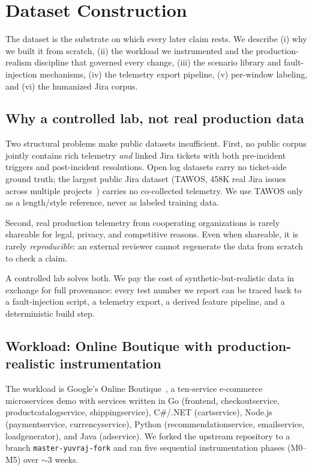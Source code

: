 \section{Dataset Construction}
\label{sec:dataset}

The dataset is the substrate on which every later claim rests. We describe (i) why we built it from scratch, (ii) the workload we instrumented and the production-realism discipline that governed every change, (iii) the scenario library and fault-injection mechanisms, (iv) the telemetry export pipeline, (v) per-window labeling, and (vi) the humanized Jira corpus.

\subsection{Why a controlled lab, not real production data}

Two structural problems make public datasets insufficient. First, no public corpus jointly contains rich telemetry \emph{and} linked Jira tickets with both pre-incident triggers and post-incident resolutions. Open log datasets carry no ticket-side ground truth; the largest public Jira dataset (TAWOS, 458K real Jira issues across multiple projects~\cite{tawos}) carries no co-collected telemetry. We use TAWOS only as a length/style reference, never as labeled training data.

Second, real production telemetry from cooperating organizations is rarely shareable for legal, privacy, and competitive reasons. Even when shareable, it is rarely \emph{reproducible}: an external reviewer cannot regenerate the data from scratch to check a claim.

A controlled lab solves both. We pay the cost of synthetic-but-realistic data in exchange for full provenance: every test number we report can be traced back to a fault-injection script, a telemetry export, a derived feature pipeline, and a deterministic build step.

\subsection{Workload: Online Boutique with production-realistic instrumentation}

The workload is Google's Online Boutique~\cite{online-boutique}, a ten-service e-commerce microservices demo with services written in Go (frontend, checkoutservice, productcatalogservice, shippingservice), C\#/.NET (cartservice), Node.js (paymentservice, currencyservice), Python (recommendationservice, emailservice, loadgenerator), and Java (adservice). We forked the upstream repository to a branch \texttt{master-yuvraj-fork} and ran five sequential instrumentation phases (M0--M5) over $\sim$3 weeks.

